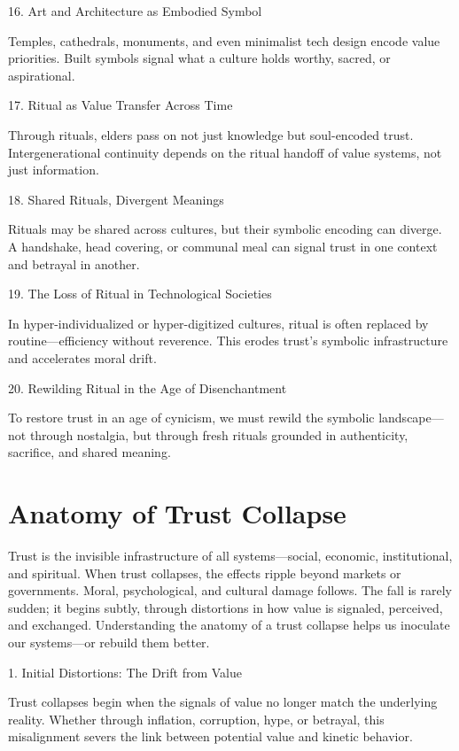 \documentclass[11pt,oneside]{book}
\begin{document}
16. Art and Architecture as Embodied Symbol


Temples, cathedrals, monuments, and even minimalist tech design encode value priorities. Built symbols signal what a culture holds worthy, sacred, or aspirational.

17. Ritual as Value Transfer Across Time


Through rituals, elders pass on not just knowledge but soul-encoded trust. Intergenerational continuity depends on the ritual handoff of value systems, not just information.

18. Shared Rituals, Divergent Meanings


Rituals may be shared across cultures, but their symbolic encoding can diverge. A handshake, head covering, or communal meal can signal trust in one context and betrayal in another.

19. The Loss of Ritual in Technological Societies


In hyper-individualized or hyper-digitized cultures, ritual is often replaced by routine—efficiency without reverence. This erodes trust’s symbolic infrastructure and accelerates moral drift.

20. Rewilding Ritual in the Age of Disenchantment


To restore trust in an age of cynicism, we must rewild the symbolic landscape—not through nostalgia, but through fresh rituals grounded in authenticity, sacrifice, and shared meaning.


\chapter{Anatomy of Trust Collapse}

Trust is the invisible infrastructure of all systems—social, economic, institutional, and spiritual. When trust collapses, the effects ripple beyond markets or governments. Moral, psychological, and cultural damage follows. The fall is rarely sudden; it begins subtly, through distortions in how value is signaled, perceived, and exchanged. Understanding the anatomy of a trust collapse helps us inoculate our systems—or rebuild them better.

1. Initial Distortions: The Drift from Value


Trust collapses begin when the signals of value no longer match the underlying reality. Whether through inflation, corruption, hype, or betrayal, this misalignment severs the link between potential value and kinetic behavior.
\end{document}
